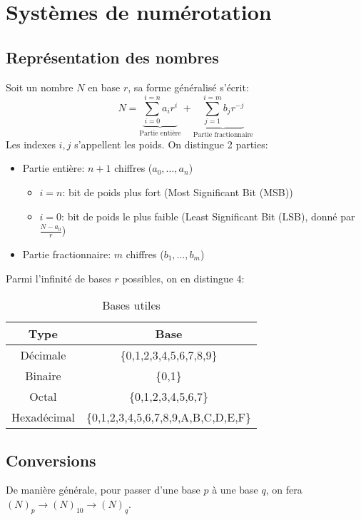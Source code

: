 \chapter{Systèmes de numérotation}
\section{Représentation des nombres}
Soit un nombre $N$ en base $r$, sa forme généralisé s'écrit:
\begin{equation}
	N = \underbrace{\sum_{i=0}^{i=n}a_ir^i}_{\text{Partie entière}} + \underbrace{\sum_{j=1}^{i=m}b_jr^{-j}}_{\text{Partie fractionnaire}}
\end{equation}
Les indexes $i,j$ s'appellent les poids. On distingue 2 parties:
\begin{itemize}
	\item Partie entière:  $n+1$ chiffres ($a_0,\dots,a_n$)
  \begin{itemize}
		\item $i=n$: bit de poids plus fort (Most Significant Bit (MSB))
	  \item $i=0$: bit de poids le plus faible (Least Significant Bit (LSB), donné par $\frac{N-a_0}{r}$)
	  \end{itemize}
	\item Partie fractionnaire: $m$ chiffres ($b_1,\dots,b_m$)
\end{itemize}
Parmi l'infinité de bases $r$ possibles, on en distingue 4:
\begin{table}
	\centering
	\begin{tabular}{|c|c|}
		\hline
		Type         & Base                                \\
		\hline
		Décimale    & \{0,1,2,3,4,5,6,7,8,9\}             \\
		Binaire      & \{0,1\}                             \\
		Octal        & \{0,1,2,3,4,5,6,7\}                 \\
		Hexadécimal & \{0,1,2,3,4,5,6,7,8,9,A,B,C,D,E,F\} \\
		\hline
	\end{tabular}
	\caption{Bases utiles}
	\label{bases utiles}
\end{table}
\section{Conversions}
De manière générale, pour passer d'une base $p$ à une base $q$, on fera $(N)_p\rightarrow (N)_{10}\rightarrow (N)_q$. \\

